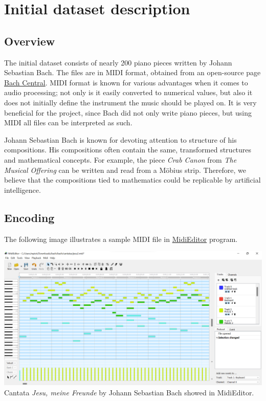 \documentclass{article}
\begin{document}
\section{Initial dataset description}
\subsection{Overview}
The initial dataset consists of nearly 200 piano pieces written by Johann Sebastian Bach. The files are in MIDI format, obtained from an open-source page \hyperlink{https://www.bachcentral.com/midiindexcomplete.html}{Bach Central}. MIDI format is known for various advantages when it comes to audio processing; not only is it easily converted to numerical values, but also it does not initially define the instrument the music should be played on. It is very beneficial for the project, since Bach did not only write piano pieces, but using MIDI all files can be interpreted as such.

Johann Sebastian Bach is known for devoting attention to structure of his compositions. His compositions often contain the same, transformed structures and mathematical concepts. For example, the piece \textit{Crab Canon} from \textit{The Musical Offering} can be written and read from a Möbius strip.\cite{Mobius} Therefore, we believe that the compositions tied to mathematics could be replicable by artificial intelligence.

\subsection{Encoding} \label{encoding}

The following image illustrates a sample MIDI file in \hyperlink{http://www.midieditor.org/}{MidiEditor} program.

\begin{center}
    \includegraphics[width=1\textwidth]{midi_sample.png} \\
    Cantata \textit{Jesu, meine Freunde} by Johann Sebastian Bach showed in MidiEditor.
    \vskip10pt \noindent
\end{center}
\end{document}
